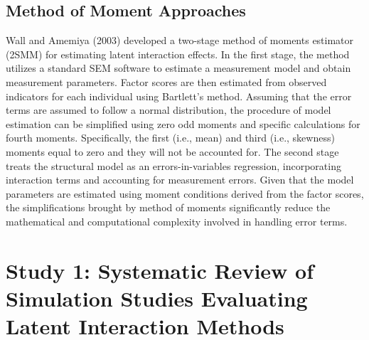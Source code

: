 \documentclass[
  11pt,
  man]{apa6}
\begin{document}
\hypertarget{method-of-moment-approaches}{%
\subsection{Method of Moment Approaches}\label{method-of-moment-approaches}}

Wall and Amemiya (2003) developed a two-stage method of moments estimator (2SMM) for estimating latent interaction effects. In the first stage, the method utilizes a standard SEM software to estimate a measurement model and obtain measurement parameters. Factor scores are then estimated from observed indicators for each individual using Bartlett's method. Assuming that the error terms are assumed to follow a normal distribution, the procedure of model estimation can be simplified using zero odd moments and specific calculations for fourth moments. Specifically, the first (i.e., mean) and third (i.e., skewness) moments equal to zero and they will not be accounted for. The second stage treats the structural model as an errors-in-variables regression, incorporating interaction terms and accounting for measurement errors. Given that the model parameters are estimated using moment conditions derived from the factor scores, the simplifications brought by method of moments significantly reduce the mathematical and computational complexity involved in handling error terms.

\newpage
\setlength{\parindent}{0.5in}

\hypertarget{study-1-systematic-review-of-simulation-studies-evaluating-latent-interaction-methods}{%
\section{Study 1: Systematic Review of Simulation Studies Evaluating Latent Interaction Methods}\label{study-1-systematic-review-of-simulation-studies-evaluating-latent-interaction-methods}}
\end{document}
